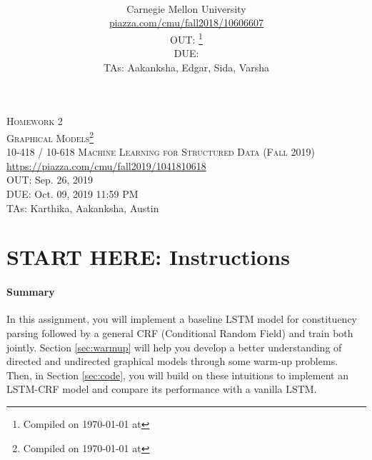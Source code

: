 \documentclass[11pt,addpoints,answers]{exam}
\title{\textsc{\hwName}} %
\author{\courseName\\
  Carnegie Mellon University \\
\url{piazza.com/cmu/fall2018/10606607} \\
OUT: \outDate{}\thanks{Compiled on \today{} at \currenttime{}} \\
DUE: \dueDate{} \\ 
TAs: Aakanksha, Edgar, Sida, Varsha}
\date{}
\date{}
\numberwithin{equation}{section} %
\numberwithin{figure}{section} %
\numberwithin{table}{section} %
\newcommand{\courseNum}{10-418 / 10-618}
\newcommand{\courseName}{Machine Learning for Structured Data}
\newcommand{\courseSem}{Fall 2019}
\newcommand{\piazzaUrl}{\url{https://piazza.com/cmu/fall2019/1041810618}}
\newcommand{\hwNum}{Homework 2}
\newcommand{\hwTopic}{Graphical Models}
\newcommand{\outDate}{Sep. 26, 2019}
\newcommand{\dueDate}{Oct. 09, 2019 11:59 PM}
\newcommand{\taNames}{Karthika, Aakanksha, Austin}
\begin{document}
\section*{}
\begin{center}
  \textsc{\LARGE \hwNum} \\
  \textsc{\LARGE \hwTopic\footnote{Compiled on \today{} at \currenttime{}}} \\
  \vspace{1em}
  \textsc{\large \courseNum{} \courseName{} (\courseSem)} \\
  \piazzaUrl\\
  \vspace{1em}
  OUT: \outDate \\
  DUE: \dueDate \\
  TAs: \taNames
\end{center}


\section*{START HERE: Instructions}

\begin{notebox}
\paragraph{Summary} In this assignment, you will implement a baseline LSTM  model for constituency parsing followed by a general  CRF (Conditional Random Field) and train both jointly. Section \ref{sec:warmup} will help you develop a better understanding of directed and undirected graphical models through some warm-up problems. Then, in Section \ref{sec:code}, you will build on these intuitions to implement an LSTM-CRF model and compare its performance with a vanilla LSTM.
\end{notebox}
\end{document}
